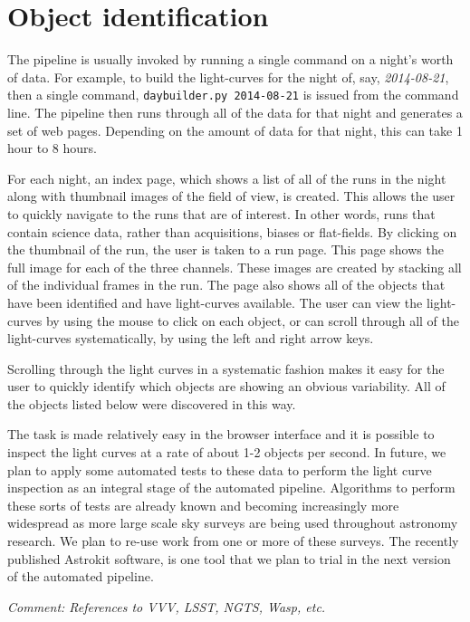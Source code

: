 
\section{Object identification}
The pipeline is usually invoked by running a single command on a night's worth of data. For example, to build the light-curves for the night of, say, \emph{2014-08-21}, then a single command, \texttt{daybuilder.py 2014-08-21} is issued from the command line. The pipeline then runs through all of the data for that night and generates a set of web pages. Depending on the amount of data for that night, this can take 1 hour to 8 hours. 

For each night, an index page, which shows a list of all of the runs in the night along with thumbnail images of the field of view, is created. This allows the user to quickly navigate to the runs that are of interest. In other words, runs that contain science data, rather than acquisitions, biases or flat-fields. By clicking on the thumbnail of the run, the user is taken to a run page. This page shows the full image for each of the three channels. These images are created by stacking all of the individual frames in the run. The page also shows all of the objects that have been identified and have light-curves available. The user can view the light-curves by using the mouse to click on each object, or can scroll through all of the light-curves systematically, by using the left and right arrow keys. 

Scrolling through the light curves in a systematic fashion makes it easy for the user to quickly identify which objects are showing an obvious variability. All of the objects listed below were discovered in this way. 

The task is made relatively easy in the browser interface and it is possible to inspect the light curves at a rate of about 1-2 objects per second. In future, we plan to apply some automated tests to these data to perform the light curve inspection as an integral stage of the automated pipeline. Algorithms to perform these sorts of tests are already known and becoming increasingly more widespread as more large scale sky surveys are being used throughout astronomy research. We plan to re-use work from one or more of these surveys. The recently published Astrokit software, \citep{Astrokit2014} is one tool that we plan to trial in the next version of the automated pipeline. 

\emph{Comment: References to VVV, LSST, NGTS, Wasp,  etc.}

